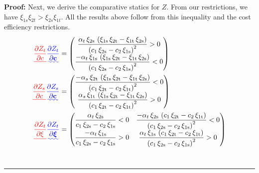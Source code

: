 \documentclass[11pt,a4paper,leqno]{extarticle}
\newenvironment{proof}[1][Proof]{\noindent\textbf{#1:} }{\ \rule{0.5em}{0.5em}}
\providecommand{\DIFadd}[1]{{\protect\color{blue}\uwave{#1}}} %
\providecommand{\DIFdel}[1]{{\protect\color{red}\sout{#1}}}                      %
\providecommand{\DIFaddbegin}{} %
\providecommand{\DIFaddend}{} %
\providecommand{\DIFdelbegin}{} %
\providecommand{\DIFdelend}{} %
\begin{document}
\begin{proof}
	Next, we derive the comparative statics for \DIFdelbegin \DIFdel{$Z$}\DIFdelend \DIFaddbegin \DIFadd{$\mathbf{Z}$}\DIFaddend . From our restrictions, we have $\xi_{1s}\xi_{2t} > \xi_{2s}\xi_{1t}$. All the results above follow from this inequality and the cost efficiency restrictions. 
	\begin{align*}
	\DIFdelbegin \DIFdel{\frac{\partial Z_t}{\partial c} }\DIFdelend \DIFaddbegin \DIFadd{\frac{\partial Z_t}{\partial \mathbf{c}} }\DIFaddend &= 
	\begin{pmatrix}
	\dfrac{\alpha _{t}\,\xi _{\mathrm{2s}}\,\left(\xi _{\mathrm{1s}}\,\xi _{\mathrm{2t}}-\xi _{\mathrm{1t}}\,\xi _{\mathrm{2s}}\right)}{{\left(c_{1}\,\xi _{\mathrm{2s}}-c_{2}\,\xi _{\mathrm{1s}}\right)}^2}>0\\
	\dfrac{-\alpha _{t}\,\xi _{\mathrm{1s}}\,\left(\xi _{\mathrm{1s}}\,\xi _{\mathrm{2t}}-\xi _{\mathrm{1t}}\,\xi _{\mathrm{2s}}\right)}{{\left(c_{1}\,\xi _{\mathrm{2s}}-c_{2}\,\xi _{\mathrm{1s}}\right)}^2}<0
	\end{pmatrix}\\
	\DIFdelbegin \DIFdel{\frac{\partial Z_s}{\partial c} }\DIFdelend \DIFaddbegin \DIFadd{\frac{\partial Z_s}{\partial \mathbf{c}} }\DIFaddend &= 
	\begin{pmatrix}
	\dfrac{-\alpha _{s}\,\xi _{\mathrm{2t}}\,\left(\xi _{\mathrm{1s}}\,\xi _{\mathrm{2t}}-\xi _{\mathrm{1t}}\,\xi _{\mathrm{2s}}\right)}{{\left(c_{1}\,\xi _{\mathrm{2t}}-c_{2}\,\xi _{\mathrm{1t}}\right)}^2} <0\\
	\dfrac{\alpha _{s}\,\xi _{\mathrm{1t}}\,\left(\xi _{\mathrm{1s}}\,\xi _{\mathrm{2t}}-\xi _{\mathrm{1t}}\,\xi _{\mathrm{2s}}\right)}{{\left(c_{1}\,\xi _{\mathrm{2t}}-c_{2}\,\xi _{\mathrm{1t}}\right)}^2} >0
	\end{pmatrix}\\
	\DIFdelbegin \DIFdel{\frac{\partial Z_t}{\partial \xi} }\DIFdelend \DIFaddbegin \DIFadd{\frac{\partial Z_t}{\partial \boldsymbol{\xi}} }\DIFaddend &= 
	\begin{pmatrix}
	\dfrac{\alpha _{t}\,\xi _{\mathrm{2s}}}{c_{1}\,\xi _{\mathrm{2s}}-c_{2}\,\xi _{\mathrm{1s}}} < 0& \dfrac{-\alpha _{t}\,\xi _{\mathrm{2s}}\,\left(c_{1}\,\xi _{\mathrm{2t}}-c_{2}\,\xi _{\mathrm{1t}}\right)}{{\left(c_{1}\,\xi _{\mathrm{2s}}-c_{2}\,\xi _{\mathrm{1s}}\right)}^2} <0 \\
	\dfrac{-\alpha _{t}\,\xi _{\mathrm{1s}}}{c_{1}\,\xi _{\mathrm{2s}}-c_{2}\,\xi _{\mathrm{1s}}} >0& \dfrac{\alpha _{t}\,\xi _{\mathrm{1s}}\,\left(c_{1}\,\xi _{\mathrm{2t}}-c_{2}\,\xi _{\mathrm{1t}}\right)}{{\left(c_{1}\,\xi _{\mathrm{2s}}-c_{2}\,\xi _{\mathrm{1s}}\right)}^2} >0\\

\end{pmatrix}
\end{align*}
\end{proof}
\end{document}
